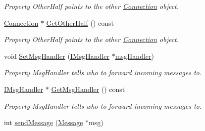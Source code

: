 \begin{DoxyCompactItemize}
\begin{DoxyCompactList}\small\item\em Property OtherHalf points to the other \hyperlink{classPseudoTcp_1_1Connection}{Connection} object. \item\end{DoxyCompactList}\item 
\hypertarget{classPseudoTcp_1_1Connection_af0205c16aaed4f8cf890c04cb1afff79}{
\hyperlink{classPseudoTcp_1_1Connection}{Connection} $\ast$ \hyperlink{classPseudoTcp_1_1Connection_af0205c16aaed4f8cf890c04cb1afff79}{GetOtherHalf} () const }
\label{classPseudoTcp_1_1Connection_af0205c16aaed4f8cf890c04cb1afff79}

\begin{DoxyCompactList}\small\item\em Property OtherHalf points to the other \hyperlink{classPseudoTcp_1_1Connection}{Connection} object. \item\end{DoxyCompactList}\item 
\hypertarget{classPseudoTcp_1_1Connection_a8a30ac2a4127fb80437b68ead090fb07}{
void \hyperlink{classPseudoTcp_1_1Connection_a8a30ac2a4127fb80437b68ead090fb07}{SetMsgHandler} (\hyperlink{classPseudoTcp_1_1IMsgHandler}{IMsgHandler} $\ast$\hyperlink{classPseudoTcp_1_1Connection_a48abbd96a00e8b85c2c6d57174956520}{msgHandler})}
\label{classPseudoTcp_1_1Connection_a8a30ac2a4127fb80437b68ead090fb07}

\begin{DoxyCompactList}\small\item\em Property MsgHandler tells who to forward incoming messages to. \item\end{DoxyCompactList}\item 
\hypertarget{classPseudoTcp_1_1Connection_ac3557ef20de80b18c0730f9fa0ad6752}{
\hyperlink{classPseudoTcp_1_1IMsgHandler}{IMsgHandler} $\ast$ \hyperlink{classPseudoTcp_1_1Connection_ac3557ef20de80b18c0730f9fa0ad6752}{GetMsgHandler} () const }
\label{classPseudoTcp_1_1Connection_ac3557ef20de80b18c0730f9fa0ad6752}

\begin{DoxyCompactList}\small\item\em Property MsgHandler tells who to forward incoming messages to. \item\end{DoxyCompactList}\item 
\hypertarget{classPseudoTcp_1_1Connection_adfed6f5dc37e5eaf919b465886b0f11d}{
int \hyperlink{classPseudoTcp_1_1Connection_adfed6f5dc37e5eaf919b465886b0f11d}{sendMessage} (\hyperlink{classPseudoTcp_1_1Message}{Message} $\ast$msg)}
\label{classPseudoTcp_1_1Connection_adfed6f5dc37e5eaf919b465886b0f11d}


\end{DoxyCompactItemize}
